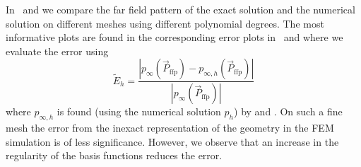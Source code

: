
In~ and  we compare the far field pattern of the exact solution and the numerical solution on different meshes using different polynomial degrees. The most informative plots are found in the corresponding error plots in~ and  where we evaluate the error using
\begin{equation}\label{Eq2:relError}
	\tilde{E}_h = \frac{\left|p_\infty(\vec{P}_{\mathrm{ffp}})-p_{\infty,h}(\vec{P}_{\mathrm{ffp}})\right|}{\left|p_\infty(\vec{P}_{\mathrm{ffp}})\right|}
\end{equation}
where $p_{\infty,h}$ is found (using the numerical solution $p_h$) by  and . On such a fine mesh the error from the inexact representation of the geometry in the FEM simulation is of less significance. However, we observe that an increase in the regularity of the basis functions reduces the error.

